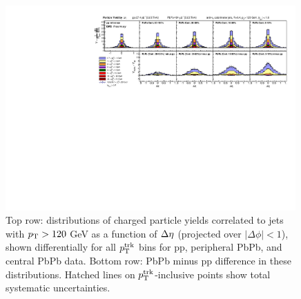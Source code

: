  \begin{figure}[hbt]
    \begin{center}
       \includegraphics[width=0.99\textwidth]{figures/results/Yield_dEta_Stacked.pdf}
         \caption[Inclusive jet $\Delta\eta$ correlations at 5.02 TeV]{Top row: distributions of charged particle yields correlated to jets with $p_{\rm T} > 120$ GeV as a function of $\protect\Delta\eta$ (projected over $|\Delta\phi| < 1$), shown differentially for all $p_{\rm T}^{\rm trk}$ bins for pp, peripheral PbPb, and central PbPb data. Bottom row:  PbPb minus pp difference in these distributions.  Hatched lines on $p_{\rm T}^{\rm trk}$-inclusive points show total systematic uncertainties. }
       \label{fig:yield_deta_stacked}
    \end{center}
 \end{figure}
 
